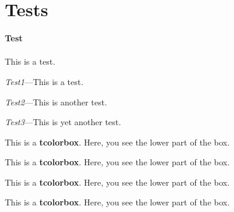 \chapter{Tests}

\begin{tcolorbox}%
   \small\textbf{
       Test
   }\\~\\
   This is a test.
   \begin{compactitem}
      \item \textit{Test1}---This is a test.
      \item \textit{Test2}---This is another test.
      \item \textit{Test3}---This is yet another test.
   \end{compactitem}
\end{tcolorbox}

\begin{tcolorbox}[colback=red!5!white,colframe=red!75!black,title=My Heading]
This is a \textbf{tcolorbox}.
\tcblower
Here, you see the lower part of the box.
\end{tcolorbox}

\begin{tcolorbox}[colback=yellow!5!white,colframe=yellow!75!black,title=My Heading]
This is a \textbf{tcolorbox}.
\tcblower
Here, you see the lower part of the box.
\end{tcolorbox}

\begin{tcolorbox}[colback=blue!5!white,colframe=blue!75!black,title=My Heading]
This is a \textbf{tcolorbox}.
\tcblower
Here, you see the lower part of the box.
\end{tcolorbox}

\begin{tcolorbox}[colback=green!5!white,colframe=green!75!black,title=My Heading]
This is a \textbf{tcolorbox}.
\tcblower
Here, you see the lower part of the box.
\end{tcolorbox}

